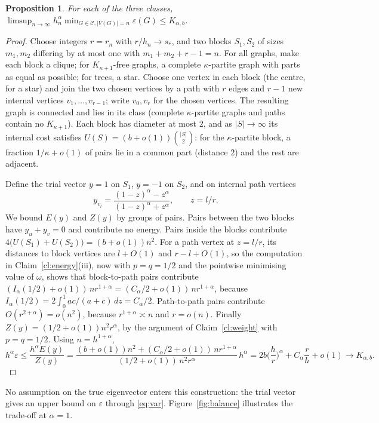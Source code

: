\documentclass[11pt,a4paper]{article}
\newtheorem{proposition}[theorem]{Proposition}
\theoremstyle{definition}
\newcommand{\eps}{\varepsilon}
\begin{document}
\begin{proposition}\label{prop:construction}
For each of the three classes, $\limsup_{n\to\infty}h_n^\alpha\min_{G\in\mathcal C,|V(G)|=n}\eps(G)\le K_{\alpha,b}$.
\end{proposition}
\begin{proof}
Choose integers $r=r_n$ with $r/h_n\to s_*$, and two blocks $S_1,S_2$ of sizes $m_1,m_2$ differing by at most one with $m_1+m_2+r-1=n$. For all graphs, make each block a clique; for $K_{\kappa+1}$-free graphs, a complete $\kappa$-partite graph with parts as equal as possible; for trees, a star. Choose one vertex in each block (the centre, for a star) and join the two chosen vertices by a path with $r$ edges and $r-1$ new internal vertices $v_1,\dots,v_{r-1}$; write $v_0,v_r$ for the chosen vertices. The resulting graph is connected and lies in its class (complete $\kappa$-partite graphs and paths contain no $K_{\kappa+1}$). Each block has diameter at most $2$, and as $|S|\to\infty$ its internal cost satisfies $U(S)=(b+o(1))\binom{|S|}2$: for the $\kappa$-partite block, a fraction $1/\kappa+o(1)$ of pairs lie in a common part (distance $2$) and the rest are adjacent.

Define the trial vector $y=1$ on $S_1$, $y=-1$ on $S_2$, and on internal path vertices
\[
 y_{v_l}=\frac{(1-z)^\alpha-z^\alpha}{(1-z)^\alpha+z^\alpha},\qquad z=l/r.
\]
We bound $E(y)$ and $Z(y)$ by groups of pairs. Pairs between the two blocks have $y_u+y_v=0$ and contribute no energy. Pairs inside the blocks contribute $4\big(U(S_1)+U(S_2)\big)=(b+o(1))n^2$. For a path vertex at $z=l/r$, its distances to block vertices are $l+O(1)$ and $r-l+O(1)$, so the computation in Claim~\ref{cl:energy}(iii), now with $p=q=1/2$ and the pointwise minimising value of $\omega$, shows that block-to-path pairs contribute $(I_\alpha(1/2)+o(1))\,nr^{1+\alpha}=(C_\alpha/2+o(1))\,nr^{1+\alpha}$, because $I_\alpha(1/2)=2\int_0^1ac/(a+c)\,dz=C_\alpha/2$. Path-to-path pairs contribute $O(r^{2+\alpha})=o(n^2)$, because $r^{1+\alpha}\asymp n$ and $r=o(n)$. Finally $Z(y)=(1/2+o(1))n^2r^\alpha$, by the argument of Claim~\ref{cl:weight} with $p=q=1/2$. Using $n=h^{1+\alpha}$,
\[
 h^\alpha\eps\le\frac{h^\alpha E(y)}{Z(y)}=\frac{(b+o(1))n^2+(C_\alpha/2+o(1))\,nr^{1+\alpha}}{(1/2+o(1))\,n^2r^\alpha}\,h^\alpha
 =2b\Big(\frac hr\Big)^\alpha+C_\alpha\frac rh+o(1)\longrightarrow K_{\alpha,b}.
\]
\end{proof}

No assumption on the true eigenvector enters this construction: the trial vector gives an upper bound on $\eps$ through \eqref{eq:var}. Figure~\ref{fig:balance} illustrates the trade-off at $\alpha=1$.
\end{document}
